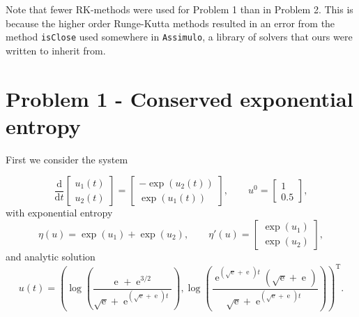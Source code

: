 \documentclass{report}
\renewcommand{\exp}[1]{\operatorname{e}^{#1}}
\newcommand{\expalt}{\operatorname{exp}}
\newcommand{\T}{\mathrm{T}}
\begin{document}
    \vspace*{5mm}
    Note that fewer RK-methods were used for Problem 1 than in Problem 2. This is because the higher order Runge-Kutta methods resulted in an error from the method \texttt{isClose} used somewhere in \texttt{Assimulo}, a library of solvers that ours were written to inherit from.



\section{Problem 1 - Conserved exponential entropy}
    First we consider the system

    \[\frac{\text{d}}{\text{d}t}
    \begin{bmatrix}
        u_1(t)\\
        u_2(t)
    \end{bmatrix} =
    \begin{bmatrix}
        -\expalt(u_2(t))\\
        \expalt(u_1(t))
    \end{bmatrix}, \qquad u^0 =
    \begin{bmatrix}
        1\\
        0.5
    \end{bmatrix},
    \]
    with exponential entropy
    \[\eta(u) = \expalt(u_1) + \expalt(u_2), \qquad \eta'(u) =
    \begin{bmatrix}
        \expalt(u_1)\\
        \expalt(u_2)
    \end{bmatrix},
    \]
    and analytic solution
    \[u(t) = \left(\log\left(\frac{\exp{} + \exp{3/2}}{\sqrt{\exp{}} + \exp{(\sqrt{\exp{}}+\exp{})t}}\right), \log\left(\frac{\exp{(\sqrt{\exp{}}+\exp{})t}(\sqrt{\exp{}}+\exp{})}{\sqrt{\exp{}} + \exp{(\sqrt{\exp{}}+\exp{})t}}\right)\right)^{\T}.\]
\end{document}
